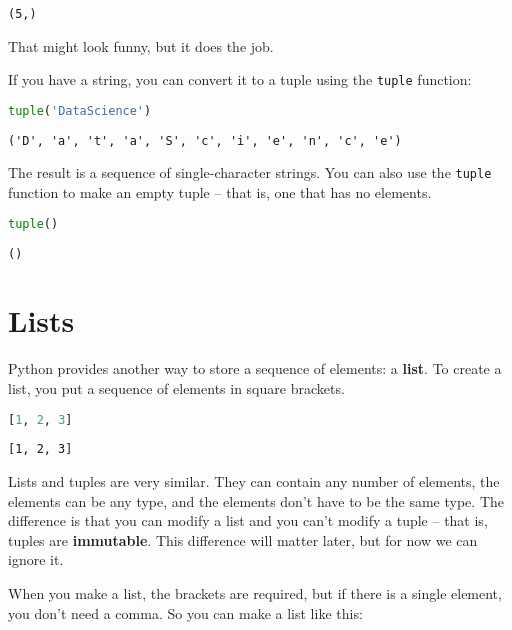 \documentclass[
]{book}
\newcommand{\passthrough}[1]{#1}
\begin{document}
\begin{lstlisting}
(5,)
\end{lstlisting}

That might look funny, but it does the job.

If you have a string, you can convert it to a tuple using the
\passthrough{\lstinline!tuple!} function:

\begin{lstlisting}[language=Python]
tuple('DataScience')
\end{lstlisting}

\begin{lstlisting}
('D', 'a', 't', 'a', 'S', 'c', 'i', 'e', 'n', 'c', 'e')
\end{lstlisting}

The result is a sequence of single-character strings. You can also use
the \passthrough{\lstinline!tuple!} function to make an empty tuple --
that is, one that has no elements.

\begin{lstlisting}[language=Python]
tuple()
\end{lstlisting}

\begin{lstlisting}
()
\end{lstlisting}

\section{Lists}\label{lists}

Python provides another way to store a sequence of elements: a
\textbf{list}. To create a list, you put a sequence of elements in
square brackets.

\begin{lstlisting}[language=Python]
[1, 2, 3]
\end{lstlisting}

\begin{lstlisting}
[1, 2, 3]
\end{lstlisting}

Lists and tuples are very similar. They can contain any number of
elements, the elements can be any type, and the elements don't have to
be the same type. The difference is that you can modify a list and you
can't modify a tuple -- that is, tuples are \textbf{immutable}. This
difference will matter later, but for now we can ignore it.

When you make a list, the brackets are required, but if there is a
single element, you don't need a comma. So you can make a list like
this:
\end{document}
